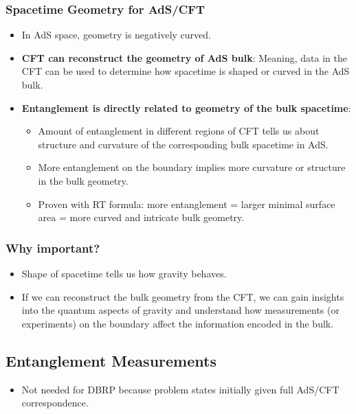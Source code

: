 \documentclass[12pt]{article}
\begin{document}
    \subsubsection*{Spacetime Geometry for AdS/CFT}
    \begin{itemize}
        \item In AdS space, geometry is negatively curved.
        \item \textbf{CFT can reconstruct the geometry of AdS bulk}: Meaning, data in the CFT can be used to determine how spacetime is shaped or curved in the AdS bulk.
        \item \textbf{Entanglement is directly related to geometry of the bulk spacetime}: 
        \begin{itemize}
            \item Amount of entanglement in different regions of CFT tells us about structure and curvature of the corresponding bulk spacetime in AdS.
            \item More entanglement on the boundary implies more curvature or structure in the bulk geometry.
            \item Proven with RT formula: more entanglement = larger minimal surface area = more curved and intricate bulk geometry.
        \end{itemize}
    \end{itemize}

    \subsubsection*{Why important?}
    \begin{itemize}
        \item Shape of spacetime tells us how gravity behaves.
        \item If we can reconstruct the bulk geometry from the CFT, we can gain insights into the quantum aspects of gravity and understand how measurements (or experiments) on the boundary affect the information encoded in the bulk.
    \end{itemize}

\subsection*{Entanglement Measurements}
\begin{itemize}
    \item Not needed for DBRP because problem states initially given full AdS/CFT correspondence.
\end{itemize}
\end{document}
